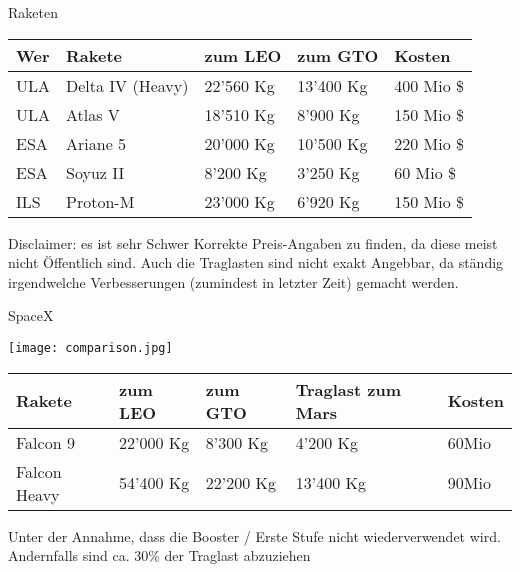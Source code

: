 \begin{frame}[c]{Raketen}

    \begin{tabular}{l|l|l|l|l}
        Wer &   Rakete         &   zum LEO &  zum GTO  &  Kosten         \\ \hline
        ULA & Delta IV (Heavy) & 22'560 Kg & 13'400 Kg & 400 Mio \$      \\ \hline
        ULA & Atlas V          & 18'510 Kg &  8'900 Kg & 150 Mio \$      \\ \hline
        ESA & Ariane 5         & 20'000 Kg & 10'500 Kg & 220 Mio \$      \\ \hline
        ESA & Soyuz II         &  8'200 Kg &  3'250 Kg & 60 Mio  \$      \\ \hline
        ILS & Proton-M         & 23'000 Kg &  6'920 Kg & 150 Mio \$      \\
    \end{tabular}


    \footnotesize
    Disclaimer: es ist sehr Schwer Korrekte Preis-Angaben zu finden, da diese meist nicht Öffentlich sind.
    Auch die Traglasten sind nicht exakt Angebbar, da ständig irgendwelche Verbesserungen (zumindest in letzter Zeit)
    gemacht werden.

\end{frame}


\begin{frame}[c]{SpaceX}

    \texttt{[image: comparison.jpg]} \\

    \begin{tabular}{l|l|l|l|l}
        Rakete       & zum LEO   & zum GTO   & Traglast zum Mars & Kosten \\ \hline
        Falcon 9     & 22'000 Kg &  8'300 Kg &  4'200 Kg         & 60Mio  \\ \hline
        Falcon Heavy & 54'400 Kg & 22'200 Kg & 13'400 Kg         & 90Mio  \\
    \end{tabular}


    \footnotesize
    Unter der Annahme, dass die Booster / Erste Stufe nicht wiederverwendet wird.
    Andernfalls sind ca. 30\% der Traglast abzuziehen

\end{frame}


